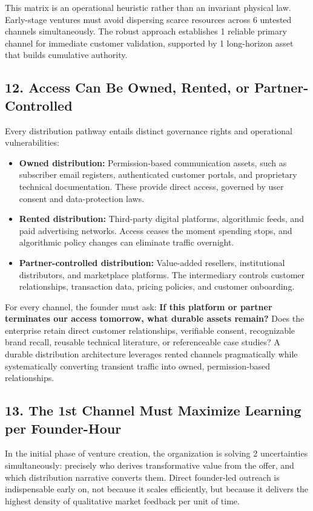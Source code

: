 This matrix is an operational heuristic rather than an invariant physical law. Early-stage ventures must avoid dispersing scarce resources across 6 untested channels simultaneously. The robust approach establishes 1 reliable primary channel for immediate customer validation, supported by 1 long-horizon asset that builds cumulative authority.

\subsection*{12. Access Can Be Owned, Rented, or Partner-Controlled}

Every distribution pathway entails distinct governance rights and operational vulnerabilities:
\begin{itemize}[leftmargin=*,itemsep=1pt]
  \item \textbf{Owned distribution:} Permission-based communication assets, such as subscriber email registers, authenticated customer portals, and proprietary technical documentation. These provide direct access, governed by user consent and data-protection laws.
  \item \textbf{Rented distribution:} Third-party digital platforms, algorithmic feeds, and paid advertising networks. Access ceases the moment spending stops, and algorithmic policy changes can eliminate traffic overnight.
  \item \textbf{Partner-controlled distribution:} Value-added resellers, institutional distributors, and marketplace platforms. The intermediary controls customer relationships, transaction data, pricing policies, and customer onboarding.
\end{itemize}

For every channel, the founder must ask: \textbf{If this platform or partner terminates our access tomorrow, what durable assets remain?} Does the enterprise retain direct customer relationships, verifiable consent, recognizable brand recall, reusable technical literature, or referenceable case studies? A durable distribution architecture leverages rented channels pragmatically while systematically converting transient traffic into owned, permission-based relationships.

\subsection*{13. The 1st Channel Must Maximize Learning per Founder-Hour}

In the initial phase of venture creation, the organization is solving 2 uncertainties simultaneously: precisely who derives transformative value from the offer, and which distribution narrative converts them. Direct founder-led outreach is indispensable early on, not because it scales efficiently, but because it delivers the highest density of qualitative market feedback per unit of time.

